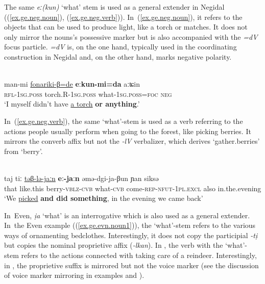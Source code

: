 \documentclass[output=paper,colorlinks,citecolor=brown
\ChapterDOI{10.5281/zenodo.15697577}
]{langscibook}
\begin{document}
The same \textit{eː(kun)} `what' stem is used as a general extender in Negidal ((\ref{ex.ge.neg.noun}), (\ref{ex.ge.neg.verb})). In~(\ref{ex.ge.neg.noun}), it refers to the objects that can be used to produce light, like a torch or matches. It does not only mirror the nouns's possessive marker but is also accompanied with the \textit{=dV} focus particle. \textit{=dV} is, on the one hand, typically used in the coordinating construction in Negidal and, on the other hand, marks negative polarity.


 \ea \label{ex.ge.neg.noun}
 \\
\gll man-mi \uline{fonariki-β=de} \textbf{eːkun-mi=da} aːʨin\\
\textsc{rfl}-\textsc{1sg.poss} torch.R-\textsc{1sg.poss} what-\textsc{1sg.poss}=\textsc{foc} \textsc{neg}\\
\glt `I myself didn't have \uline{a torch} \textbf{or anything}.' \\
 \z
{}

In~(\ref{ex.ge.neg.verb}), the same `what'-stem is used as a verb referring to the actions people usually perform when going to the forest, like picking berries. It mirrors the converb affix but not the \textit{-lV} verbalizer, which derives `gather.berries' from `berry'.

 \ea \label{ex.ge.neg.verb}
 \\
\gll taj tiː \uline{təβ-lə-jaːn} \textbf{eː-jaːn} əmə-dgi-ja-βun ɲan siksə\\
that like.this berry-\textsc{vblz}-\textsc{cvb} what-\textsc{cvb} come-\textsc{rep}-\textsc{nfut}-\textsc{1pl.excl} also in.the.evening\\
\glt `We \uline{picked} \textbf{and did something}, in the evening we came back' \\
 \z
{}

In~Even, \textit{ịa} `what' is an interrogative which is also used as a general extender. In~the Even example ((\ref{ex.ge.evn.noun1})), the `what'-stem refers to the various ways of ornamenting bedclothes. Interestingly, it does not copy the participial \textit{-tị} but copies the nominal proprietive affix (\textit{-lkan}). In , the verb with the `what'-stem refers to the actions connected with taking care of a reindeer. Interestingly, in , the proprietive suffix is mirrored but not the voice marker (see the discussion of voice marker mirroring in examples  and ).
\end{document}

